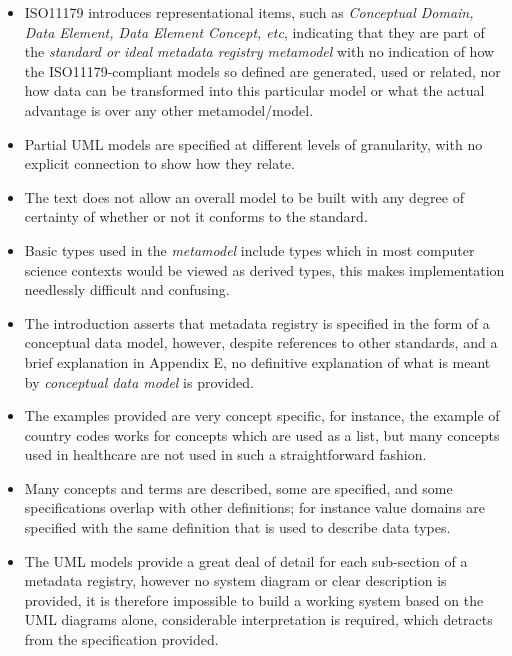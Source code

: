 \documentclass[runningheads]{llncs}
\begin{document}
	\begin{itemize}
		\item ISO11179 introduces representational items, such as \emph{Conceptual Domain, Data Element, Data Element Concept, etc}, indicating that they are part of the \emph{standard or ideal metadata registry metamodel} with no indication of how the ISO11179-compliant models so defined are generated, used or related, nor how data can be transformed into this particular model or what the actual advantage is over any other metamodel/model.
		\item Partial UML models are specified at different levels of granularity, with no explicit connection to show how they relate.
		\item The text does not allow an overall model to be built with any degree of certainty of whether or not it conforms to the standard.
		\item Basic types used in the \emph{metamodel} include types which in most computer science contexts would be viewed as derived types, this makes implementation needlessly difficult and confusing.
		\item The introduction asserts that metadata registry is specified in the form of a conceptual data model, however, despite references to other standards, and a brief explanation in Appendix E, no definitive explanation of what is meant by \emph{conceptual data model} is provided. 
		\item The examples provided are very concept specific, for instance, the example of country codes works for concepts which are used as a list, but many concepts used in healthcare are not used in such a straightforward fashion. 
		\item Many concepts and terms are described, some are specified, and some specifications overlap with other definitions; for instance value domains are specified with the same definition that is used to describe data types.
		\item The UML models provide a great deal of detail for each sub-section of a metadata registry, however no system diagram or clear description is provided, it is therefore impossible to build a working system based on the UML diagrams alone, considerable interpretation is required, which detracts from the specification provided.
	\end{itemize}
\end{document}

